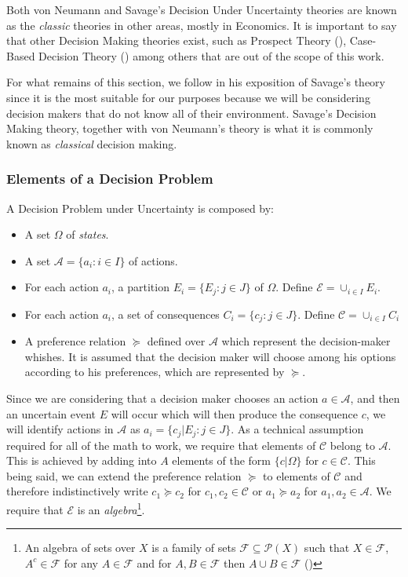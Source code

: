 \documentclass[english,letterpaper,12pt,final]{article}
\theoremstyle{definition}
\begin{document}
Both von Neumann and Savage's Decision Under Uncertainty theories are known as the \textit{classic} theories in other areas, mostly in Economics. It is important to say that other Decision Making theories exist, such as Prospect Theory (\cite{kahneman1979prospect}), Case-Based Decision Theory (\cite{gilboa1995case}) among others that are out of the scope of this work.

For what remains of this section, we follow \cite{bernardo2000bayesian} in his exposition of Savage's theory since it is the most suitable for our purposes because we will be considering decision makers that do not know all of their environment. Savage's Decision Making theory, together with von Neumann's theory is what it is commonly known as \textit{classical} decision making. 
	
	\subsubsection{Elements of a Decision Problem}
	A Decision Problem under Uncertainty is composed by:
	\begin{itemize}
	\item A set $\Omega$ of \textit{states}.
	\item A set $\mathcal{A}=\{a_i : i \in I \}$ of actions.
	\item For each action $a_i$, a partition $E_i = \{ E_j : j \in J \}$ of $\Omega$. Define $\mathcal{E} = \cup_{i \in I } E_i$.
	\item For each action $a_i$, a set of consequences $C_i = \{ c_j : j \in J \}$. Define $\mathcal{C}=\cup_{i \in I} C_i$
	\item A preference relation $\succeq$ defined over $\mathcal{A}$ which represent the decision-maker whishes. It is assumed that the decision maker will choose among his options according to his preferences, which are represented by $\succeq$.
	\end{itemize}
	Since we are considering that a decision maker chooses an action $a \in \mathcal{A}$, and then an uncertain event $E$ will occur which will then produce the consequence $c$, we will identify actions in $\mathcal{A}$ as $a_i = \{ c_j | E_j : j \in J \}$. As a technical assumption required for all of the math to work, we require that elements of $\mathcal{C}$ belong to $\mathcal{A}$. This is achieved by adding into $A$ elements of the form $\{ c | \Omega \}$ for $c \in \mathcal{C}$. This being said, we can extend the preference relation $\succeq$ to elements of $\mathcal{C}$ and therefore indistinctively write $c_1 \succeq c_2$ for $c_1, c_2 \in \mathcal{C}$ or $a_1 \succeq a_2$ for $a_1,a_2 \in \mathcal{A}$. We require that $\mathcal{E}$ is an \textit{algebra}\footnote{An algebra of sets over $X$ is a family of sets $\mathcal{F} \subseteq \mathcal{P}(X)$ such that $X \in \mathcal{F}$, $A^c \in \mathcal{F}$ for any $A \in \mathcal{F}$ and for $A,B \in \mathcal{F}$ then $A \cup B \in \mathcal{F}$ (\cite{ash2000probability})}.	
\end{document}
